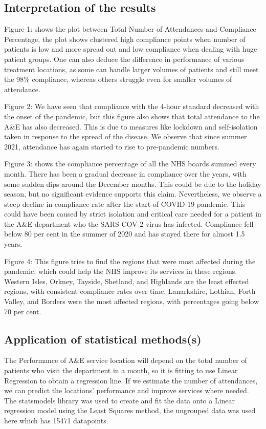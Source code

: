\documentclass[11pt,a4paper]{article}
\begin{document}
\subsection{Interpretation of the results}
Figure 1: shows the plot between Total Number of Attendances and Compliance Percentage, the plot shows clustered high compliance points when number of patients is low and more spread out and low compliance when dealing with huge patient groups. One can also deduce the difference in performance of various treatment locations, as some can handle larger volumes of patients and still meet the 98\% compliance, whereas others struggle even for smaller volumes of attendance.

Figure 2: We have seen that compliance with the 4-hour standard decreased with the onset of the pandemic, but this figure also shows that total attendance to the A&E has also decreased. This is due to measures like lockdown and self-isolation taken in response to the spread of the disease. We observe that since summer 2021, attendance has again started to rise to pre-pandemic numbers.

Figure 3: shows the compliance percentage of all the NHS boards summed every month. There has been a gradual decrease in compliance over the years, with some sudden dips around the December months. This could be due to the holiday season, but no significant evidence supports this claim. Nevertheless, we observe a steep decline in compliance rate after the start of COVID-19 pandemic. This could have been caused by strict isolation and critical care needed for a patient in the A\&E department who the SARS-COV-2 virus has infected. Compliance fell below 80 per cent in the summer of 2020 and has stayed there for almost 1.5 years.

Figure 4: This figure tries to find the regions that were most affected during the pandemic, which could help the NHS improve its services in these regions. Western Isles, Orkney, Tayside, Shetland, and Highlands are the least effected regions, with consistent compliance rates over time. Lanarkshire, Lothian, Forth Valley, and Borders were the most affected regions, with percentages going below 70 per cent.

\subsection{Application of statistical methods(s)}

The Performance of A\&E service location will depend on the total number of patients who visit the department in a month, so it is fitting to use Linear Regression to obtain a regression line. If we estimate the number of attendances, we can predict the locations' performance and improve services where needed. The statsmodels library was used to create and fit the data onto a Linear regression model using the Least Squares method, the ungrouped data was used here which has 15471 datapoints. 
\end{document}
